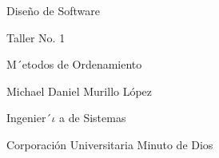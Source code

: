 \documentclass[12pt]{article}
\begin{document}
\begin{adjustwidth}{1.73in}{1.73in}
\begin{Center}
{\fontsize{17pt}{20.4pt}\selectfont Diseño de Software\par}
\end{Center}\par

\end{adjustwidth}

\begin{adjustwidth}{2.99in}{2.99in}
\begin{Center}
{\fontsize{17pt}{20.4pt}\selectfont Taller No. 1\par}
\end{Center}\par

\end{adjustwidth}

\begin{adjustwidth}{1.2in}{1.2in}
\begin{Center}
{\fontsize{17pt}{20.4pt}\selectfont M´etodos de Ordenamiento\par}
\end{Center}\par

\end{adjustwidth}


\vspace{\baselineskip}
\begin{adjustwidth}{0.0in}{2.47in}
\begin{FlushRight}
Michael Daniel Murillo López
\end{FlushRight}\par

\end{adjustwidth}

\begin{adjustwidth}{2.79in}{2.79in}
\begin{Center}
Ingenier´$\iota$ a de Sistemas
\end{Center}\par

\end{adjustwidth}

\begin{adjustwidth}{2.08in}{2.08in}
\begin{Center}
Corporación Universitaria Minuto de Dios
\end{Center}\par

\end{adjustwidth}
\end{document}
